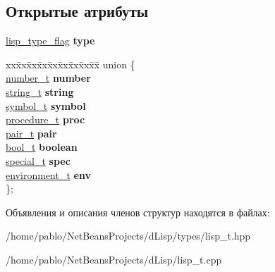 \subsection*{Открытые атрибуты}
\begin{DoxyCompactItemize}
\item 
\mbox{\label{structlisp__t_af4d31fea3ded5de3f14b57a6eb9f996c}} 
\mbox{\hyperlink{lisp__type__flag_8hpp_a055b7e4c72b7a614806ae1225539b99f}{lisp\+\_\+type\+\_\+flag}} {\bfseries type}
\item 
\mbox{\label{structlisp__t_a466003f82a1bafc2c3c743266fe5ab47}} 
\begin{tabbing}
xx\=xx\=xx\=xx\=xx\=xx\=xx\=xx\=xx\=\kill
union \{\\
\>\mbox{\hyperlink{classnumber__t}{number\_t}} {\bfseries number}\\
\>\mbox{\hyperlink{classstring__t}{string\_t}} {\bfseries string}\\
\>\mbox{\hyperlink{lisp__types_8hpp_a543c62d3ca4ba3750602b9c6b11af1de}{symbol\_t}} {\bfseries symbol}\\
\>\mbox{\hyperlink{classprocedure__t}{procedure\_t}} {\bfseries proc}\\
\>\mbox{\hyperlink{classpair__t}{pair\_t}} {\bfseries pair}\\
\>\mbox{\hyperlink{classbool__t}{bool\_t}} {\bfseries boolean}\\
\>\mbox{\hyperlink{classspecial__t}{special\_t}} {\bfseries spec}\\
\>\mbox{\hyperlink{classenvironment__t}{environment\_t}} {\bfseries env}\\
\}; \\

\end{tabbing}\end{DoxyCompactItemize}


Объявления и описания членов структур находятся в файлах\+:\begin{DoxyCompactItemize}
\item 
/home/pablo/\+Net\+Beans\+Projects/d\+Lisp/types/lisp\+\_\+t.\+hpp\item 
/home/pablo/\+Net\+Beans\+Projects/d\+Lisp/lisp\+\_\+t.\+cpp\end{DoxyCompactItemize}
